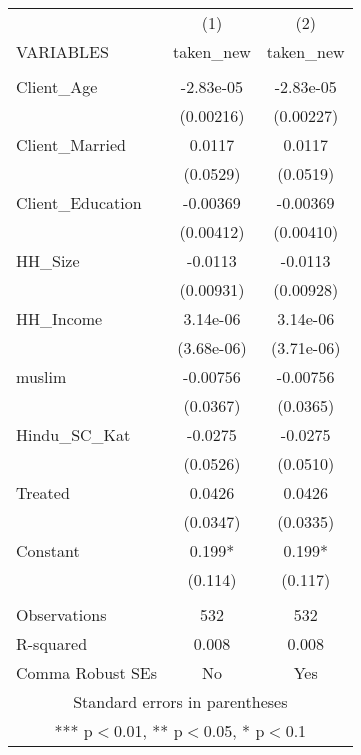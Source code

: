 \begin{tabular}{lcc} \hline
 & (1) & (2) \\
VARIABLES & taken\_new & taken\_new \\ \hline
 &  &  \\
Client\_Age & -2.83e-05 & -2.83e-05 \\
 & (0.00216) & (0.00227) \\
Client\_Married & 0.0117 & 0.0117 \\
 & (0.0529) & (0.0519) \\
Client\_Education & -0.00369 & -0.00369 \\
 & (0.00412) & (0.00410) \\
HH\_Size & -0.0113 & -0.0113 \\
 & (0.00931) & (0.00928) \\
HH\_Income & 3.14e-06 & 3.14e-06 \\
 & (3.68e-06) & (3.71e-06) \\
muslim & -0.00756 & -0.00756 \\
 & (0.0367) & (0.0365) \\
Hindu\_SC\_Kat & -0.0275 & -0.0275 \\
 & (0.0526) & (0.0510) \\
Treated & 0.0426 & 0.0426 \\
 & (0.0347) & (0.0335) \\
Constant & 0.199* & 0.199* \\
 & (0.114) & (0.117) \\
 &  &  \\
Observations & 532 & 532 \\
R-squared & 0.008 & 0.008 \\
 Comma Robust SEs & No & Yes \\ \hline
\multicolumn{3}{c}{ Standard errors in parentheses} \\
\multicolumn{3}{c}{ *** p$<$0.01, ** p$<$0.05, * p$<$0.1} \\
\end{tabular}
